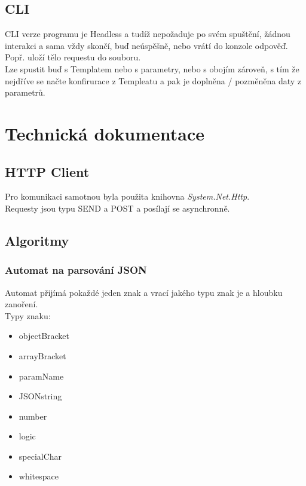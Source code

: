 \documentclass[a4paper]{article}
\begin{document}
    \subsection{CLI}
        CLI verze programu je Headless a tudíž nepožaduje po svém spuštění, žádnou interakci
        a sama vždy skončí, buď neúspěšně, nebo vrátí do konzole odpověď.
        Popř. uloží tělo requestu do souboru.\\
        Lze spustit buď s Templatem nebo s parametry, nebo s obojím zároveň,
        s tím že nejdříve se načte konfirurace z Templeatu a pak je doplněna /
        pozměněna daty z parametrů. 
\section{Technická dokumentace}
    \subsection{HTTP Client}
        Pro komunikaci samotnou byla použita knihovna \textit{System.Net.Http}.\\
        Requesty jsou typu SEND a POST a posílají se asynchronně.
    \subsection{Algoritmy}
        \subsubsection{Automat na parsování JSON}
            Automat přijímá pokaždé jeden znak a vrací jakého typu znak je
            a hloubku zanoření.\\
            Typy znaku:
            \begin{itemize}
                \item objectBracket
                \item arrayBracket
                \item paramName
                \item JSONstring
                \item number
                \item logic
                \item specialChar
                \item whitespace
            \end{itemize}
\end{document}
